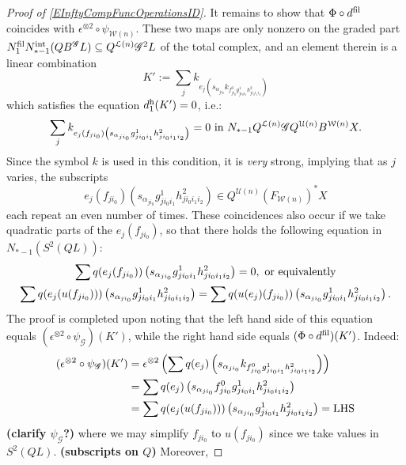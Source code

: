 \documentclass[11pt]{amsart}
\theoremstyle{plain}
\theoremstyle{definition}
\newcommand{\scrQ}{\mathscr{Q}}
\newcommand{\scrR}{\mathscr{R}}
\newcommand{\scrT}{\mathscr{T}}
\newcommand{\scrY}{\mathscr{Y}}
\newcommand{\scrI}{\mathscr{I}}
\newcommand{\scrO}{\mathscr{O}}
\newcommand{\scrP}{\mathscr{P}}
\newcommand{\scrS}{\mathscr{S}}
\newcommand{\scrG}{\mathscr{G}}
\newcommand{\scrH}{\mathscr{H}}
\newcommand{\scrJ}{\mathscr{J}}
\newcommand{\scrK}{\mathscr{K}}
\newcommand{\scrL}{\mathscr{L}}
\newcommand{\scrZ}{\mathscr{Z}}
\newcommand{\scrN}{\mathscr{N}}
\newcommand{\scrM}{\mathscr{M}}
\newcommand{\calW}{\mathcal{W}}
\newcommand{\calU}{\mathcal{U}}
\newcommand{\calL}{\mathcal{L}}
\theoremstyle{plain}
\newcommand{\BSW}{{\scrG}}%
\newcommand{\BSWres}{B^\BSW}%
\begin{document}
\begin{Composite functor spectral sequences}
\begin{tricky proofs of operation compatibilities}
\begin{proof}[Proof of \ref{EInftyCompFuncOperationsID}]
It remains to show that $\Phi\circ d^\textup{fil}$ coincides with $\epsilon^{\otimes 2}\circ\psi_{\calW(n)}$. These two maps are only nonzero on the graded part $N_1^\textup{fil}N_{*-1}^\textup{int}(Q\BSWres L)\subseteq Q^{\calL(n)}\BSW^2 L$ of the total complex, and an element therein is a linear combination
\[K':=\sum_j k_{e_j\left(s_{\alpha_{ji_0}} k_{f^0_{ji_0}g^1_{ji_0i_1}h^2_{ji_0i_1i_2}}\right)}\]
which satisfies the equation $d_1^\textup{h}(K')=0$, i.e.:
\[\sum_j k_{e_j(f_{ji_0})\left(s_{\alpha_{ji_0}} {g^1_{ji_0i_1}h^2_{ji_0i_1i_2}}\right)}=0\textup{ in }N_{*-1}Q^{\calL(n)}\BSW Q^{\calU(n)}B^{\calW(n)}X.\]
Since the symbol $k$ is used in this condition, it is \emph{very} strong, implying that as $j$ varies, the subscripts 
\[e_j(f_{ji_0})\left(s_{\alpha_{ji_0}} {g^1_{ji_0i_1}h^2_{ji_0i_1i_2}}\right)\in Q^{\calU(n)}(F_{\calW(n)})^*X\]
each repeat an even number of times. %
These coincidences also occur if we take quadratic parts of the $e_j(f_{ji_0})$, so that there holds the following equation in $N_{*-1}(S^2(QL))$:
\begin{gather*}
\sum q(e_j(f_{ji_0}))\left(s_{\alpha_{ji_0}} {g^1_{ji_0i_1}h^2_{ji_0i_1i_2}}\right)=0,\textup{ or equivalently}\\
\sum q(e_j(u(f_{ji_0})))\left(s_{\alpha_{ji_0}} {g^1_{ji_0i_1}h^2_{ji_0i_1i_2}}\right)
=
\sum q(u(e_j)(f_{ji_0}))\left(s_{\alpha_{ji_0}} {g^1_{ji_0i_1}h^2_{ji_0i_1i_2}}\right).
\end{gather*}
The proof is completed upon noting that the left hand side of this equation equals $(\epsilon^{\otimes 2}\circ \psi_{\BSW})(K')$, while the right hand side equals $(\Phi\circ d^\textup{fil})(K')$. Indeed:
\begin{alignat*}{2}
(\epsilon^{\otimes 2}\circ \psi_{\BSW})(K')
&=
\epsilon^{\otimes 2}\left(\sum q(e_j)\left(s_{\alpha_{ji_0}} k_{f^0_{ji_0}g^1_{ji_0i_1}h^2_{ji_0i_1i_2}}\right)\right)%
\\
&=
\sum q(e_j)\left(s_{\alpha_{ji_0}} f^0_{ji_0}g^1_{ji_0i_1}h^2_{ji_0i_1i_2}\right)%
\\
&=
\sum q(e_j(u(f_{ji_0})))\left(s_{\alpha_{ji_0}} g^1_{ji_0i_1}h^2_{ji_0i_1i_2}\right)=\textup{LHS}
\end{alignat*}
\textbf{(clarify $\psi_{\BSW}$?)} where we may simplify $f_{ji_0}$ to $u(f_{ji_0})$ since we take values in $S^2(QL)$. \textbf{(subscripts on $Q$)} Moreover,

\end{proof}
\end{tricky proofs of operation compatibilities}
\end{Composite functor spectral sequences}
\end{document}
